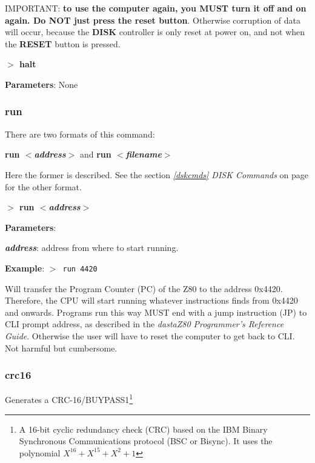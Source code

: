 \documentclass[a4paper,11pt]{article}
\begin{document}
        IMPORTANT: \textbf{to use the computer again, you MUST turn it off and
        on again. Do NOT just press the reset button}. Otherwise corruption of
        data will occur, because the \textbf{DISK} controller is only reset at
        power on, and not when the \textbf{RESET} button is pressed.

        \hspace{1.9cm}\textbf{$>$ halt}

        \textbf{Parameters}: None

        \subsubsection{{\color{blue}run}}
        There are two formats of this command:

        \textbf{run \textit{$<$address$>$}} and \textbf{run 
        \textit{$<$filename$>$}}
        
        Here the former is described. See the section \textit{\ref{dskcmds}
        DISK Commands} on page \pageref{dskcmds} for the other format.

        \hspace{1.9cm}\textbf{$>$ run \textit{$<$address$>$}}

        \textbf{Parameters}:

        \hspace{1cm}\textbf{\textit{address}}: address from where to start
        running.
        
        \textbf{Example}: \texttt{$>$ run 4420}

        Will transfer the Program Counter (PC) of the Z80 to the address
        0x4420. Therefore, the CPU will start running whatever instructions
        finds from 0x4420 and onwards. Programs run this way MUST end with a
        jump instruction (JP) to CLI prompt address, as described in the
        \textit{dastaZ80 Programmer’s Reference Guide}\cite{dastaz80progref}.
        Otherwise the user will have to reset the computer to get back to CLI.
        Not harmful but cumbersome.

        \subsubsection{{\color{blue}crc16}}
        Generates a CRC-16/BUYPASS1\footnote{A 16-bit cyclic redundancy
        check (CRC) based on the IBM Binary Synchronous Communications
        protocol\cite{ibmbsc} (BSC or Bisync). It uses the polynomial
        $X^{16} + X^{15} +X^2 + 1$}
\end{document}
